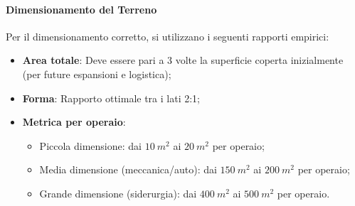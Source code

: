 \paragraph{Dimensionamento del Terreno} Per il dimensionamento corretto, si utilizzano i seguenti rapporti empirici:
\begin{itemize}
    \item \textbf{Area totale}: Deve essere pari a 3 volte la superficie coperta inizialmente (per future espansioni e logistica);
    \item \textbf{Forma}: Rapporto ottimale tra i lati 2:1;
    \item \textbf{Metrica per operaio}:
          \begin{itemize}
              \item Piccola dimensione: dai $10\ m^2$ ai $20\ m^2$ per operaio;
              \item Media dimensione (meccanica/auto): dai $150\ m^2$ ai $ 200\ m^{2} $ per operaio;
              \item Grande dimensione (siderurgia): dai $ 400\ m^{2} $ ai $ 500\ m^{2} $ per operaio.
          \end{itemize}
\end{itemize}